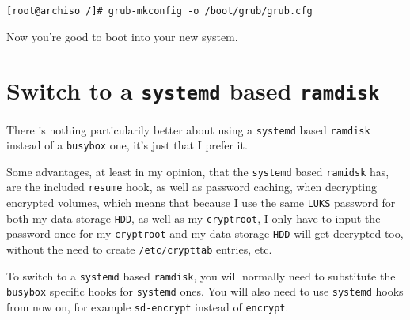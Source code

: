 \documentclass[10pt]{dustdoc}
\begin{document}
\begin{verbatim}
[root@archiso /]# grub-mkconfig -o /boot/grub/grub.cfg
\end{verbatim}

Now you’re good to boot into your new system.

\section{Switch to a \texttt{systemd} based \texttt{ramdisk}}
\label{sec:switch-to-a-systemd-based-ramdisk}

\begin{NOTE}
    There is nothing particularily better about using a \texttt{systemd} based \texttt{ramdisk} instead of a \texttt{busybox} one, it’s just that I prefer it.

    Some advantages, at least in my opinion, that the \texttt{systemd} based \texttt{ramidsk} has, are the included \texttt{resume} hook, as well as password caching, when decrypting encrypted volumes, which means that because I use the same \texttt{LUKS} password for both my data storage \texttt{HDD}, as well as my \texttt{cryptroot}, I only have to input the password once for my \texttt{cryptroot} and my data storage \texttt{HDD} will get decrypted too, without the need to create \texttt{/etc/crypttab} entries, etc.
\end{NOTE}

To switch to a \texttt{systemd} based \texttt{ramdisk}, you will normally need to substitute the \texttt{busybox} specific hooks for \texttt{systemd} ones.
You will also need to use \texttt{systemd} hooks from now on, for example \texttt{sd-encrypt} instead of \texttt{encrypt}.
\end{document}
